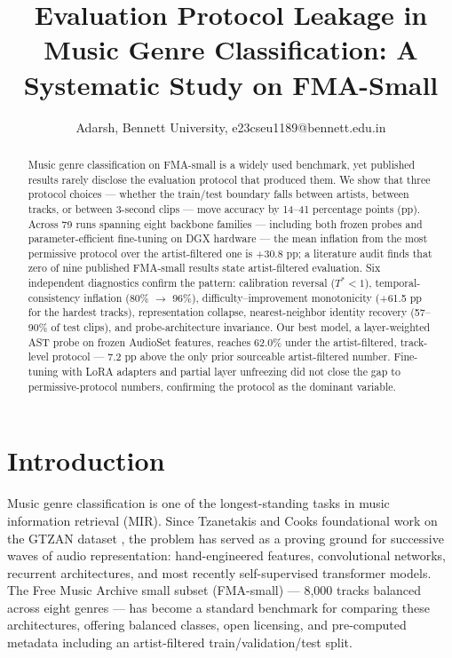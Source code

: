 \documentclass[conference]{IEEEtran}
\title{Evaluation Protocol Leakage in Music Genre Classification: A
Systematic Study on FMA-Small}
\author{Adarsh, Bennett University, e23cseu1189@bennett.edu.in}
\begin{document}
\maketitle

\begin{abstract}
Music genre classification on FMA-small is a widely used benchmark, yet
published results rarely disclose the evaluation protocol that produced
them. We show that three protocol choices --- whether the train/test
boundary falls between artists, between tracks, or between 3-second
clips --- move accuracy by 14--41 percentage points (pp). Across
79 runs spanning eight backbone families --- including both frozen
probes and parameter-efficient fine-tuning on DGX hardware --- the
mean inflation from the most permissive protocol over the
artist-filtered one is +30.8 pp; a literature audit finds that zero of
nine published FMA-small results state artist-filtered evaluation. Six
independent diagnostics confirm the pattern: calibration reversal
(\(T^* < 1\)), temporal-consistency inflation (80\% \(\to\) 96\%),
difficulty--improvement monotonicity (+61.5 pp for the hardest
tracks), representation collapse, nearest-neighbor identity recovery
(57--90\% of test clips), and probe-architecture invariance. Our best
model, a layer-weighted AST probe on frozen AudioSet features, reaches
62.0\% under the artist-filtered, track-level protocol --- 7.2 pp
above the only prior sourceable artist-filtered number. Fine-tuning with
LoRA adapters and partial layer unfreezing did not close the gap to
permissive-protocol numbers, confirming the protocol as the dominant
variable.
\end{abstract}

\section{Introduction}\label{introduction}

Music genre classification is one of the longest-standing tasks in music
information retrieval (MIR). Since Tzanetakis and Cook\textquotesingle s
foundational work on the GTZAN dataset \citep{tzanetakis2002musical},
the problem has served as a proving ground for successive waves of audio
representation: hand-engineered features, convolutional networks,
recurrent architectures, and most recently self-supervised transformer
models. The Free Music Archive small subset (FMA-small)
\citep{defferrard2017fma} --- 8,000 tracks balanced across eight
genres --- has become a standard benchmark for comparing these
architectures, offering balanced classes, open licensing, and
pre-computed metadata including an artist-filtered train/validation/test
split.
\end{document}
